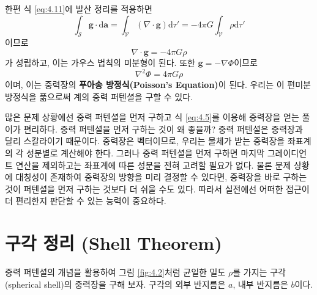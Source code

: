 \documentclass[chapter, oneside, b5paper]{oblivoir}
\theoremstyle{plain}
\theoremstyle{definition}
\theoremstyle{remark}
\begin{document}
한편 식 \ref{eq:4.11}에 발산 정리를 적용하면
\begin{equation}
    \int_{\mathcal{S}}\mathbf{g} \cdot \mathrm{d}\mathbf{a} = \int_{\mathcal{V}} (\nabla \cdot \mathbf{g}) \mathrm{d}\tau' = -4 \pi G \int_{\mathcal{V}} \rho \mathrm{d} \tau'
\end{equation}
이므로
\begin{equation}
    \nabla \cdot \mathbf{g} = -4 \pi G \rho
\end{equation}
가 성립하고, 이는 가우스 법칙의 미분형이 된다. 또한 $\mathbf{g} = -\nabla \Phi$이므로
\begin{equation}
    \nabla^2 \Phi = 4\pi G \rho
\end{equation}
이며, 이는 중력장의 \textbf{푸아송 방정식(Poisson's Equation)}이 된다. 우리는 이 편미분방정식을 풂으로써 계의 중력 퍼텐셜을 구할 수 있다.

많은 문제 상황에선 중력 퍼텐셜을 먼저 구하고 식 \ref{eq:4.5}를 이용해 중력장을 얻는 풀이가 편리하다. 중력 퍼텐셜을 먼저 구하는 것이 왜 좋을까? 중력 퍼텐셜은 중력장과 달리 스칼라이기 때문이다. 중력장은 벡터이므로, 우리는 물체가 받는 중력장을 좌표계의 각 성분별로 계산해야 한다. 그러나 중력 퍼텐셜을 먼저 구하면 마지막 그레이디언트 연산을 제외하고는 좌표계에 따른 성분을 전혀 고려할 필요가 없다. 물론 문제 상황에 대칭성이 존재하여 중력장의 방향을 미리 결정할 수 있다면, 중력장을 바로 구하는 것이 퍼텐셜을 먼저 구하는 것보다 더 쉬울 수도 있다. 따라서 실전에선 어떠한 접근이 더 편리한지 판단할 수 있는 능력이 중요하다.

\section{구각 정리 (Shell Theorem)}
중력 퍼텐셜의 개념을 활용하여 그림 \ref{fig:4.2}처럼 균일한 밀도 $\rho$를 가지는 구각(spherical shell)의 중력장을 구해 보자. 구각의 외부 반지름은 $a$, 내부 반지름은 $b$이다.
\end{document}
